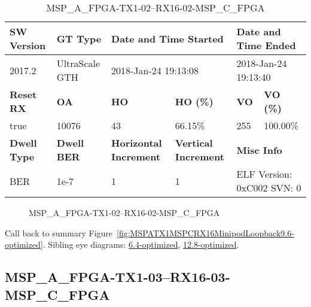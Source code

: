 \begin{table}[h]
\centering
\caption{MSP\_A\_FPGA-TX1-02--RX16-02-MSP\_C\_FPGA}
\label{tab:MSPAFPGATX102RX1602MSPCFPGA9.6-optimized}
\begin{tabular}{@{}|l|l|l|l|l|l|@{}}
\toprule
\textbf{SW Version}                & \textbf{GT Type}   & \multicolumn{2}{l|}{\textbf{Date and Time Started}}            & \multicolumn{2}{l|}{\textbf{Date and Time Ended}}        \\ \midrule
2017.2                       & UltraScale GTH          & \multicolumn{2}{l|}{2018-Jan-24 19:13:08}                   & \multicolumn{2}{l|}{2018-Jan-24 19:13:40}               \\ \midrule
\textbf{Reset RX}                  & \textbf{OA} & \textbf{HO}   & \textbf{HO (\%)} & \textbf{VO} & \textbf{VO (\%)} \\ \midrule
true & 10076        & 43          & 66.15\%        & 255        & 100.00\%       \\ \midrule
\textbf{Dwell Type}                & \textbf{Dwell BER} & \textbf{Horizontal Increment} & \textbf{Vertical Increment}    & \multicolumn{2}{l|}{\textbf{Misc Info}}                  \\ \midrule
BER                            & 1e-7        & 1        & 1           & \multicolumn{2}{l|}{ELF Version: 0xC002 SVN: 0}                         \\ \bottomrule
\end{tabular}
\end{table}

\begin{figure}[h]
\caption{MSP\_A\_FPGA-TX1-02--RX16-02-MSP\_C\_FPGA} \label{fig:MSPAFPGATX102RX1602MSPCFPGA9.6-optimized}
\end{figure}

Call back to summary Figure~\ref{fig:MSPATX1MSPCRX16MinipodLoopback9.6-optimized}.
Sibling eye diagrams: \hyperref[sec:MSPAFPGATX102RX1602MSPCFPGA6.4-optimized]{6.4-optimized}, \hyperref[sec:MSPAFPGATX102RX1602MSPCFPGA12.8-optimized]{12.8-optimized}.

\clearpage
\newpage


\subsection{MSP\_A\_FPGA-TX1-03--RX16-03-MSP\_C\_FPGA}\label{sec:MSPAFPGATX103RX1603MSPCFPGA9.6-optimized}

